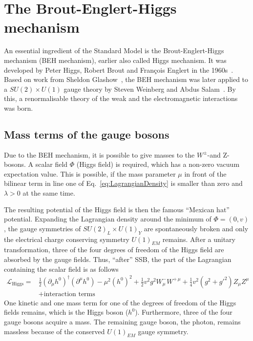\section{The Brout-Englert-Higgs mechanism}
\label{sec:HiggsMechanism}
An essential ingredient of the Standard Model is the Brout-Englert-Higgs mechanism (BEH mechanism), earlier also called Higgs mechanism.
It was developed by Peter Higgs, Robert Brout and Fran\c{c}ois Englert in the 1960s~\cite{bib:HiggsMechanism_Brout_Englert,bib:Higgs_Prediction,bib:Higgs_Prediction_2,bib:HiggsMechanism_Guralnik_Hagen_Kibble,bib:HiggsMechanism_Higgs_1966,bib:HiggsMechanism_Kibble_1967}. 
Based on work from Sheldon Glashow~\cite{bib:HiggsMechanism_Glashow_1961}, the BEH mechanism was later applied to a $SU(2) \times U(1)$ gauge theory by Steven Weinberg and Abdus Salam~\cite{bib:HiggsMechanism_Weinberg_1967,bib:HiggsMechanism_Salam_1968}.
By this, a renormalisable theory of the weak and the electromagnetic interactions was born.

\subsection*{Mass terms of the gauge bosons}
Due to the BEH mechanism, it is possible to give masses to the $W^{\pm}$-and Z-bosons.
A scalar field $\Phi$ (Higgs field) is required, which has a non-zero vacuum expectation value.
This is possible, if the mass parameter $\mu$ in front of the bilinear term in line one of Eq.~\eqref{eq:LagrangianDensity} is smaller than zero and $\lambda>0$ at the same time.

The resulting potential of the Higgs field is then the famous ``Mexican hat'' potential.
Expanding the Lagrangian density around the minimum of $\Phi = \left( 0,v \right)$, the gauge symmetries of $SU(2)_L \times U(1)_Y$ are spontaneously broken and only the electrical charge conserving symmetry $U(1)_{EM}$ remains.
After a unitary transformation, three of the four degrees of freedom of the Higgs field are absorbed by the gauge fields.
Thus, ``after'' SSB, the part of the Lagrangian containing the scalar field is as follows
\begin{equation}
\begin{split}
\mathcal{L}_{\text{Higgs}} =& \frac{1}{2} \left( \partial_{\mu} h^0 \right)^{\dagger} \left( \partial^{\mu} h^0 \right) - \mu^2 \left(h^0\right)^2 + \frac{1}{2} v^2 g^2 W_{\mu}^- W^{+\,\mu}
                    + \frac{1}{4} v^2 \left(g^2 + g'^2  \right)  Z_{\mu} Z^{\mu}\\
  &+ \text{interaction terms}
\end{split}
\label{eq:LHiggs}
\end{equation}
One kinetic and one mass term for one of the degrees of freedom of the Higgs fields remains, which is the Higgs boson ($h^0$).
Furthermore, three of the four gauge bosons acquire a mass.
The remaining gauge boson, the photon, remains massless because of the conserved $U(1)_{EM}$ gauge symmetry.

